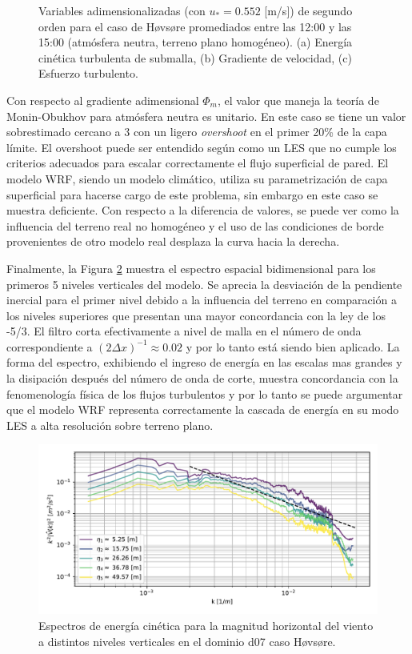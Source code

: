 \begin{figure}[H]
\begin{center}
	\end{center}
	\caption{Variables adimensionalizadas (con $u_* = 0.552$ [m/s]) de segundo orden para el caso de Høvsøre promediados entre las 12:00 y las 15:00 (atmósfera neutra, terreno plano homogéneo). (a) Energía cinética turbulenta de submalla, (b) Gradiente de velocidad, (c) Esfuerzo turbulento. }
	\label{fig:06_hov_mean_secondorder}
\end{figure}

Con respecto al gradiente adimensional $\Phi_m$, el valor que maneja la teoría de Monin-Obukhov para atmósfera neutra es unitario. En este caso se tiene un valor sobrestimado cercano a $3$ con un ligero \emph{overshoot} en el primer 20\% de la capa límite. El overshoot puede ser entendido según \cite{doi:10.1063/1.3319073} como un LES que no cumple los criterios adecuados para escalar correctamente el flujo superficial de pared. El modelo WRF, siendo un modelo climático, utiliza su parametrización de capa superficial para hacerse cargo de este problema, sin embargo en este caso se muestra deficiente. Con respecto a la diferencia de valores, se puede ver como la influencia del terreno real no homogéneo y el uso de las condiciones de borde provenientes de otro modelo real desplaza la curva hacia la derecha.

Finalmente, la Figura \ref{fig:06_hov_spectrum} muestra el espectro espacial bidimensional para los primeros 5 niveles verticales del modelo. Se aprecia la desviación de la pendiente inercial para el primer nivel debido a la influencia del terreno en comparación a los niveles superiores que presentan una mayor concordancia con la ley de los -5/3. El filtro corta efectivamente a nivel de malla en el número de onda correspondiente a $(2\Delta x)^{-1}\approx 0.02$ y por lo tanto está siendo bien aplicado. La forma del espectro, exhibiendo el ingreso de energía en las escalas mas grandes y la disipación después del número de onda de corte, muestra concordancia con la fenomenología física de los flujos turbulentos y por lo tanto se puede argumentar que el modelo WRF representa correctamente la cascada de energía en su modo LES a alta resolución sobre terreno plano.
\begin{figure}[H]
	\centering
	\includegraphics[width=1.0\linewidth,page=1,trim={3mm 5mm 3mm 3mm},clip]{Imagenes/06/hov/spectra}%
	\caption{Espectros de energía cinética para la magnitud horizontal del viento a distintos niveles verticales en el dominio d07 caso Høvsøre.}
	\label{fig:06_hov_spectrum}
\end{figure}

